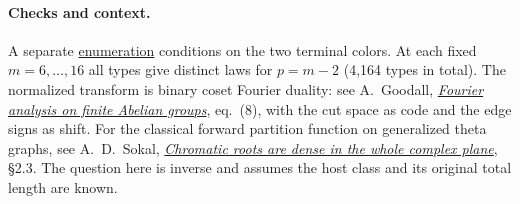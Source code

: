\documentclass[11pt]{article}
\begin{document}
\paragraph{Checks and context.}
A separate \href{https://github.com/Akhil-rav/discrete-math-lab/blob/0fb11c1/projects/finite-counting/check_single_probe.py}{enumeration}
conditions on the two terminal colors. At each fixed $m=6,\ldots,16$
all types give distinct laws for $p=m-2$ (4,164 types in total).
The normalized transform is binary coset Fourier duality: see A.~Goodall,
\href{https://iuuk.mff.cuni.cz/~andrew/dwajgApr06.pdf}{\emph{Fourier analysis on finite Abelian groups}},
eq.~(8), with the cut space as code and the edge signs as shift.
For the classical forward partition function on generalized theta graphs,
see A.~D.~Sokal, \href{https://arxiv.org/abs/cond-mat/0012369}{\emph{Chromatic
roots are dense in the whole complex plane}}, \S2.3. The question here is
inverse and assumes the host class and its original total length are known.
\end{document}
